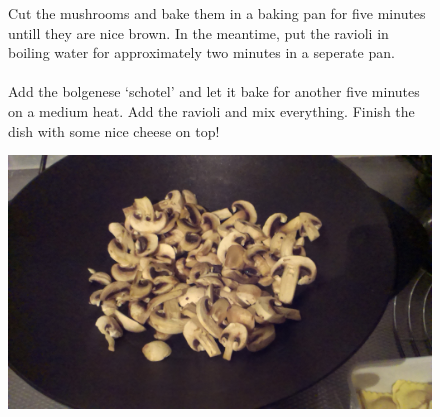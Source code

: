 \documentclass[a4paper,12pt]{report}
\begin{document}
\begin{figure}[h]

\begin{minipage}{0.6\textwidth}
Cut the mushrooms and bake them in a baking pan for five minutes untill they are nice brown. In the meantime, put the ravioli in boiling water for approximately two minutes in a seperate pan.  \\
\\
Add the bolgenese `schotel' and let it bake for another five minutes on a medium heat. Add the ravioli and mix everything. Finish the dish with some nice cheese on top!

\end{minipage}
\begin{minipage}{0.35\textwidth}
	\includegraphics[scale=0.065]{Images/mushroom.jpg}
\end{minipage}
\end{figure}
\end{document}
